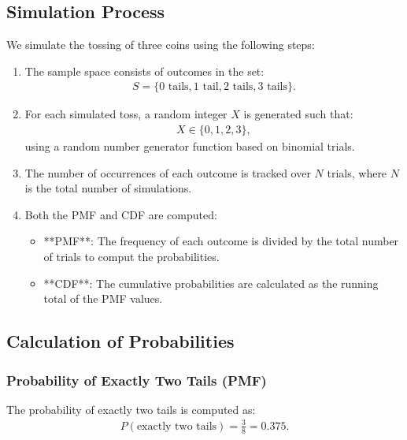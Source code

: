 \documentclass[journal]{IEEEtran}
\begin{document}
\subsection*{Simulation Process}
We simulate the tossing of three coins using the following steps:
\begin{enumerate}
    \item The sample space consists of outcomes in the set:
    \begin{align}
    S = \{0 \text{ tails}, 1 \text{ tail}, 2 \text{ tails}, 3 \text{ tails}\}.
    \end{align}
    \item For each simulated toss, a random integer \( X \) is generated such that:
    \begin{align}
    X \in \{0, 1, 2, 3\},
    \end{align}
    using a random number generator function based on binomial trials.
    \item The number of occurrences of each outcome is tracked over \( N \) trials, where \( N \) is the total number of simulations.
    \item Both the PMF and CDF are computed:
    \begin{itemize}
        \item **PMF**: The frequency of each outcome is divided by the total number of trials to comput the probabilities.
        \item **CDF**: The cumulative probabilities are calculated as the running total of the PMF values.
    \end{itemize}
\end{enumerate}

\subsection*{Calculation of Probabilities}
\subsubsection*{Probability of Exactly Two Tails (PMF)}
The probability of exactly two tails is computed as:
\begin{align}
P(\text{exactly two tails}) = \frac{3}{8} = 0.375.
\end{align}
\end{document}
